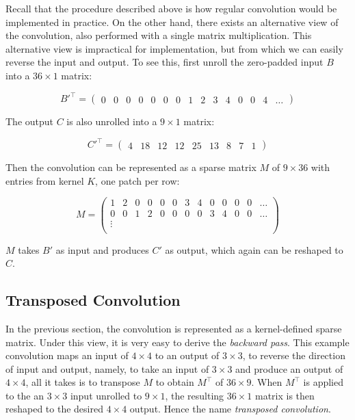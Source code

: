 Recall that the procedure described above is how regular convolution would be implemented in practice.
On the other hand, there exists an alternative view of the convolution, also performed with a single
matrix multiplication. This alternative view is impractical for implementation, but from which
we can easily reverse the input and output. To see this, first unroll the zero-padded input $B$ into
a $36 \times 1$ matrix:

\setcounter{MaxMatrixCols}{20}

$$
B'^\intercal =
  \begin{pmatrix}
    0 & 0 & 0 & 0 & 0 & 0 & 0 & 1 & 2 & 3 & 4 & 0 & 0 & 4 & \dots
  \end{pmatrix}
$$

The output $C$ is also unrolled into a $9 \times 1$ matrix:

$$
C'^\intercal =
  \begin{pmatrix}
    4 & 18 & 12 & 12 & 25 & 13 & 8 & 7 & 1
  \end{pmatrix}
$$

Then the convolution can be represented as a sparse matrix $M$ of $9 \times 36$ with entries from kernel $K$,
one patch per row:

$$
M =
  \begin{pmatrix}
    1 & 2 & 0 & 0 & 0 & 0 & 3 & 4 & 0 & 0 & 0 & 0 & \dots \\
    0 & 0 & 1 & 2 & 0 & 0 & 0 & 0 & 3 & 4 & 0 & 0 & \dots \\
    \vdots \\
  \end{pmatrix}
$$

$M$ takes $B'$ as input and produces $C'$ as output, which again can be reshaped to $C$.

\subsection{Transposed Convolution}
In the previous section, the convolution is represented as a kernel-defined sparse matrix. Under this view,
it is very easy to derive the \textit{backward pass}. This example convolution maps an input of $4 \times 4$
to an output of $3 \times 3$, to reverse the direction of input and output, namely, to take an input of
$3 \times 3$ and produce an output of $4 \times 4$, all it takes is to transpose $M$ to obtain $M^\intercal$
of $36 \times 9$. When $M^\intercal$ is applied to the an $3 \times 3$ input unrolled to $9 \times 1$, the
resulting $36 \times 1$ matrix is then reshaped to the desired $4 \times 4$ output. Hence the name
\textit{transposed convolution}.

